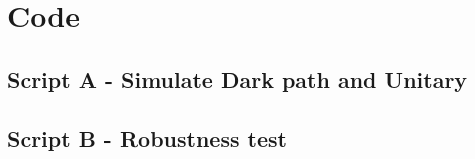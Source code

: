 \documentclass[a4paper, 12pt]{article}
\begin{document}
\section{Code}
\subsection{Script A - Simulate Dark path and Unitary}
\footnotesize


\subsection{Script B - Robustness test}
\footnotesize

\end{document}
